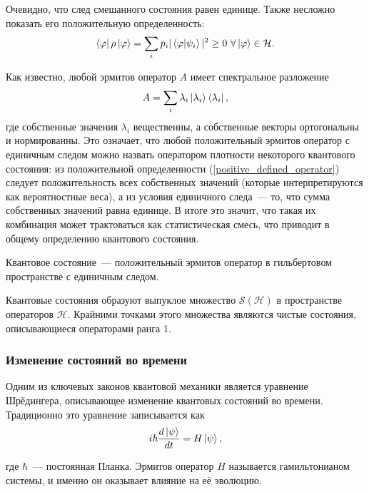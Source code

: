 Очевидно, что след смешанного состояния равен единице. Также несложно показать его положительную определенность:
\begin{equation}\label{positive_defined_operator}
  \left\langle \varphi \right|\rho\left| \varphi \right\rangle = \sum_i p_i |\left\langle \varphi|\psi_i\right\rangle|^2 \ge 0 \ \forall \left| \varphi \right\rangle \in \mathcal{H}.
\end{equation}

Как известно, любой эрмитов оператор $A$ имеет спектральное разложение
\begin{equation}
  A = \sum_i \lambda_i \left| \lambda_i \right\rangle\left\langle \lambda_i \right|,
\end{equation}
где собственные значения $\lambda_i$ вещественны, а собственные векторы  ортогональны и нормированны. Это означает, что любой положительный эрмитов оператор с единичным следом можно назвать оператором плотности некоторого квантового состояния: из положительной определенности (\ref{positive_defined_operator}) следует положительность всех собственных значений (которые интерпретируются как вероятностные веса), а из условия единичного следа~--- то, что сумма собственных значений равна единице. В итоге это значит, что такая их комбинация может трактоваться как статистическая смесь, что приводит в общему определению квантового состояния.
\begin{definition}
  Квантовое состояние~--- положительный эрмитов оператор в гильбертовом пространстве с единичным следом.
\end{definition}

Квантовые состояния образуют выпуклое множество $\mathcal{S}(\mathcal{H})$ в пространстве операторов $\mathcal{H}$. Крайними точками этого множества являются чистые состояния, описывающиеся операторами ранга 1.

\subsubsection{Изменение состояний во времени}
Одним из ключевых законов квантовой механики является уравнение Шрёдингера, описывающее изменение квантовых состояний во времени. Традиционно это уравнение записывается как 
\begin{equation}\label{shroudinger_equation}
  i \hbar \frac{d \left| \psi \right\rangle}{dt} = H \left| \psi \right\rangle, 
\end{equation}

где $\hbar$~--- постоянная Планка. Эрмитов оператор $H$ называется гамильтонианом системы, и именно он оказывает влияние на её эволюцию.

